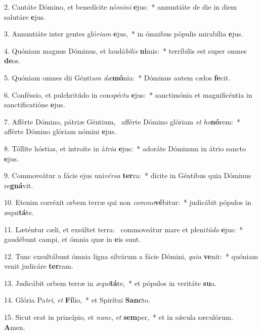 2. Cantáte Dómino, et benedícite nó\textit{mi}\textit{ni} \textbf{e}jus:~*  annuntiáte de die in diem salutáre \textbf{e}jus.\

3. Annuntiáte inter gentes gló\textit{ri}\textit{am} \textbf{e}jus,~*  in ómnibus pópulis mirabília \textbf{e}jus.\

4. Quóniam magnus Dóminus, et laudá\textit{bi}\textit{lis} \textbf{ni}mis:~*  terríbilis est super omnes \textbf{de}os.\

5. Quóniam omnes dii Génti\textit{um} \textit{dæ}\textbf{mó}nia:~*  Dóminus autem cælos \textbf{fe}cit.\

6. Conféssio, et pulchritúdo in con\textit{spéc}\textit{tu} \textbf{e}jus:~*  sanctimónia et magnificéntia in sanctificatióne \textbf{e}jus.\

7. Afférte Dómino, pátriæ Géntium, \dag\  afférte Dómino glóriam \textit{et} \textit{ho}\textbf{nó}rem:~*  afférte Dómino glóriam nómini \textbf{e}jus.\

8. Tóllite hóstias, et introíte in á\textit{tri}\textit{a} \textbf{e}jus:~*  adoráte Dóminum in átrio sancto \textbf{e}jus.\

9. Commoveátur a fácie ejus uni\textit{vér}\textit{sa} \textbf{ter}ra:~*  dícite in Géntibus quia Dóminus re\textbf{gná}vit.\

10. Etenim corréxit orbem terræ qui non \textit{com}\textit{mo}\textbf{vé}bitur:~*  judicábit pópulos in æqui\textbf{tá}te.\

11. Læténtur cæli, et exsúltet terra: \dag\  commoveátur mare et pleni\textit{tú}\textit{do} \textbf{e}jus:~*  gaudébunt campi, et ómnia quæ in \textbf{e}is sunt.\

12. Tunc exsultábunt ómnia ligna silvárum a fácie Dómini, \textit{qui}\textit{a} \textbf{ve}nit:~*  quóniam venit judicáre \textbf{ter}ram.\

13. Judicábit orbem terræ in \textit{æ}\textit{qui}\textbf{tá}te,~*  et pópulos in veritáte \textbf{su}a.\

14. Glória Pa\textit{tri}, \textit{et} \textbf{Fí}lio,~*  et Spirítui \textbf{Sanc}to.\

15. Sicut erat in princípio, et \textit{nunc}, \textit{et} \textbf{sem}per,~*  et in sǽcula sæculórum. \textbf{A}men.\

